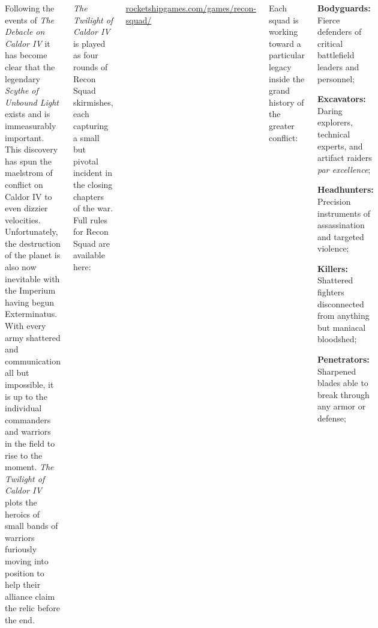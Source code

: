 \clearpage
{}

\begin{columns}

  Following the events of \emph{The Debacle on Caldor IV} it has
  become clear that the legendary \emph{Scythe of Unbound Light}
  exists and is immeasurably important.  This discovery has spun the
  maelstrom of conflict on Caldor IV to even dizzier velocities.
  Unfortunately, the destruction of the planet is also now inevitable
  with the Imperium having begun Exterminatus.  With every army
  shattered and communication all but impossible, it is up to the
  individual commanders and warriors in the field to rise to the
  moment.  \emph{The Twilight of Caldor IV} plots the heroics of small
  bands of warriors furiously moving into position to help their
  alliance claim the relic before the end.


\emph{The Twilight of Caldor IV} is played as four rounds of Recon
Squad skirmishes, each capturing a small but pivotal incident in the
closing chapters of the war.  Full rules for Recon Squad are available
here:

\centerline{\url{rocketshipgames.com/games/recon-squad/}}

\smallskip%
Each squad is working toward a particular legacy inside the grand
history of the greater conflict:

\begin{squishitemize}
\item \textbf{Bodyguards:} Fierce defenders of critical battlefield
  leaders and personnel;

\item \textbf{Excavators:} Daring explorers, technical experts, and
  artifact raiders \emph{par excellence};

\item \textbf{Headhunters:} Precision instruments of assassination and
  targeted violence;

\item \textbf{Killers:} Shattered fighters disconnected from anything
  but maniacal bloodshed;

\item \textbf{Penetrators:} Sharpened blades able to break through any
  armor or defense;


\end{squishitemize}
\end{columns}
